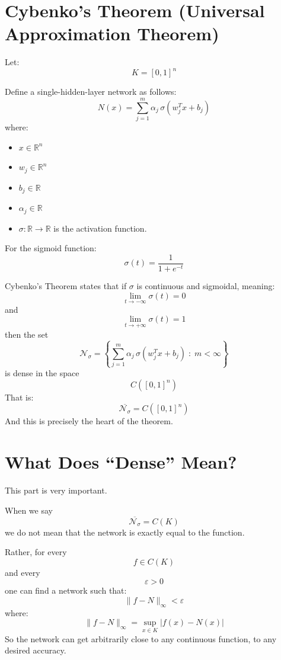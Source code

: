\documentclass{article}
\begin{document}
\section*{Cybenko's Theorem (Universal Approximation Theorem)}

Let:
\[
K = [0,1]^n
\]

Define a single-hidden-layer network as follows:
\[
N(x) = \sum_{j=1}^{m} \alpha_j \, \sigma(w_j^T x + b_j)
\]
where:
\begin{itemize}
    \item \( x \in \mathbb{R}^n \)
    \item \( w_j \in \mathbb{R}^n \)
    \item \( b_j \in \mathbb{R} \)
    \item \( \alpha_j \in \mathbb{R} \)
    \item \( \sigma : \mathbb{R} \to \mathbb{R} \) is the activation function.
\end{itemize}

For the sigmoid function:
\[
\sigma(t) = \frac{1}{1 + e^{-t}}
\]

Cybenko's Theorem states that if \( \sigma \) is continuous and sigmoidal, meaning:
\[
\lim_{t \to -\infty} \sigma(t) = 0
\]
and
\[
\lim_{t \to +\infty} \sigma(t) = 1
\]
then the set
\[
\mathcal{N}_\sigma = \left\{ \sum_{j=1}^{m} \alpha_j \, \sigma(w_j^T x + b_j) \; : \; m < \infty \right\}
\]
is dense in the space
\[
C([0,1]^n)
\]
That is:
\[
\overline{\mathcal{N}_\sigma} = C([0,1]^n)
\]
And this is precisely the heart of the theorem.

\section*{What Does ``Dense'' Mean?}

This part is very important.

When we say
\[
\overline{\mathcal{N}_\sigma} = C(K)
\]
we do not mean that the network is exactly equal to the function.

Rather, for every
\[
f \in C(K)
\]
and every
\[
\varepsilon > 0
\]
one can find a network such that:
\[
\| f - N \|_\infty < \varepsilon
\]
where:
\[
\| f - N \|_\infty = \sup_{x \in K} \left| f(x) - N(x) \right|
\]
So the network can get arbitrarily close to any continuous function, to any desired accuracy.
\end{document}
